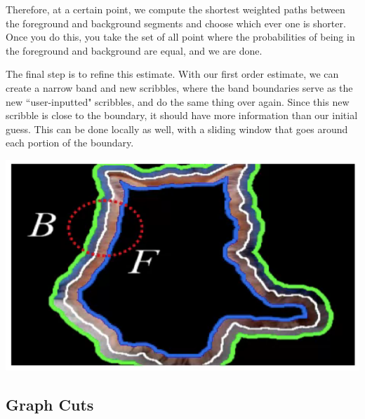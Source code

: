 \documentclass{article}
\begin{document}
    Therefore, at a certain point, we compute the shortest weighted paths between the foreground and background segments and choose which ever one is shorter. Once you do this, you take the set of all point where the probabilities of being in the foreground and background are equal, and we are done. 

    The final step is to refine this estimate. With our first order estimate, we can create a narrow band and new scribbles, where the band boundaries serve as the new ``user-inputted" scribbles, and do the same thing over again. Since this new scribble is close to the boundary, it should have more information than our initial guess. This can be done locally as well, with a sliding window that goes around each portion of the boundary. 
    \begin{center}
        \includegraphics[scale=0.3]{img/cat4.png}
    \end{center}

  \subsection{Graph Cuts}
\end{document}
